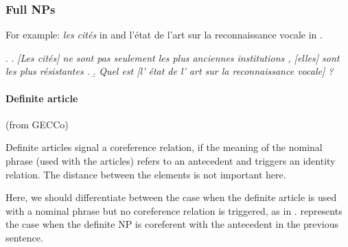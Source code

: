 \documentclass[a4paper]{article}
\begin{document}
\subsubsection{Full NPs}

For example: {\sl les cités} in \Next[a] and {l'état de l'art sur la
reconnaissance vocale} in \Next[b].

\ex.
\a.
\textsl{[Les cités] ne sont pas seulement les plus anciennes institutions ,
[elles] sont les plus résistantes .}
\b.
\textsl{Quel est [l' état de l' art sur la reconnaissance vocale] ?}


\paragraph*{Definite article}
(from GECCo)

Definite articles signal a coreference relation, if the meaning of the nominal
phrase (used with the articles) refers to an antecedent and triggers an identity
relation. The distance between the elements is not important here.

Here, we should differentiate between the case when the definite article is used
with a nominal phrase but no coreference relation is triggered, as in \Next[b].
\Next[a] represents the case when the definite NP is coreferent with the
antecedent in the previous sentence.
\end{document}
